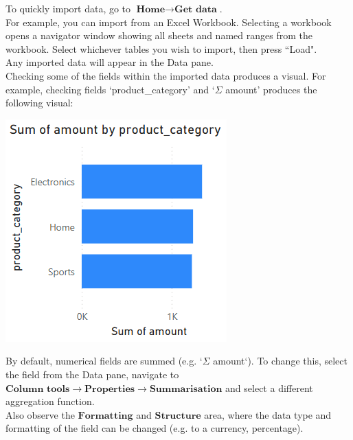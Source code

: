 \documentclass[10pt, openany, twocolumn]{book}
\begin{document}
To quickly import data, go to $\textbf{Home} \rightarrow \textbf{Get data}$.\\

For example, you can import from an Excel Workbook. Selecting a workbook opens a navigator window showing all sheets and named ranges from the workbook. Select whichever tables you wish to import, then press ``Load".\\

Any imported data will appear in the Data pane. \\

Checking some of the fields within the imported data produces a visual. For example, checking fields `product\_category' and `$\Sigma$ amount' produces the following visual:

\begin{center}
    \includegraphics[width=0.8\columnwidth]{images/select_fields.png}
\end{center}

\begin{tcolorbox}[colback=yellow!2!white, colframe=yellow!60!gray]
By default, numerical fields are summed (e.g. `$\Sigma$ amount`). To change this, select the field from the Data pane, navigate to $\textbf{Column tools} \rightarrow \textbf{Properties} \rightarrow \textbf{Summarisation}$ and select a different aggregation function.\\ Also observe the $\textbf{Formatting}$ and $\textbf{Structure}$ area, where the data type and formatting of the field can be changed (e.g. to a currency, percentage).
\end{tcolorbox}
\end{document}
